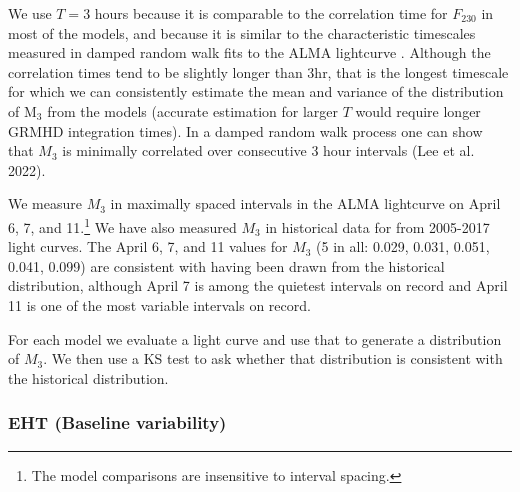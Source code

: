 We use $T = 3$ hours because it is comparable to the correlation time for $F_{230}$ in most of the models, and because it is similar to the characteristic timescales measured in damped random walk fits to the ALMA lightcurve \citep[see Table 10 of][]{Wielgus2022}.  Although the correlation times tend to be slightly longer than $3$hr, that is the longest timescale for which we can consistently estimate the mean and variance of the distribution of M$_3$ from the models (accurate estimation for larger $T$ would require longer GRMHD integration times).  In a damped random walk process one can show that $M_3$ is minimally correlated over consecutive 3 hour intervals (Lee et al. 2022).

We measure $M_3$ in maximally spaced intervals in the ALMA lightcurve on April 6, 7, and 11.\footnote{The model comparisons are insensitive to interval spacing.}  We have also measured $M_3$ in historical data for \sgra from 2005-2017 light curves.  The April 6, 7, and 11 values for $M_3$ (5 in all: 0.029, 0.031, 0.051, 0.041, 0.099) are consistent with having been drawn from the historical distribution, although April 7 is among the quietest intervals on record and April 11 is one of the most variable intervals on record.

For each model we evaluate a light curve and use that to generate a distribution of $M_3$.  We then use a KS test to ask whether that distribution is consistent with the historical distribution.  

\subsubsection{EHT (Baseline variability)\\ }


